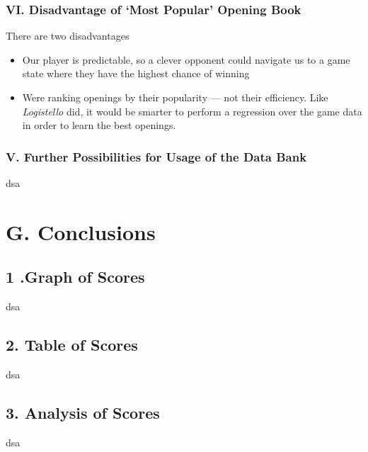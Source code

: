 \documentclass{article}
\begin{document}
\subsubsection*{VI. Disadvantage of `Most Popular' Opening Book}
There are two disadvantages
\begin{itemize}
\item Our player is predictable, so a clever opponent could navigate us to a game state where they have the highest chance of winning
\item Were ranking openings by their popularity --- not their efficiency. Like \emph{Logistello} did, it would be smarter to perform a regression over the game data in order to learn the best openings.
\end{itemize}

\subsubsection*{V. Further Possibilities for Usage of the Data Bank}
dsa

\section*{G. Conclusions}
\subsection*{1 .Graph of Scores}
dsa

\subsection*{2. Table of Scores}
dsa

\subsection*{3. Analysis of Scores}
dsa
\end{document}
